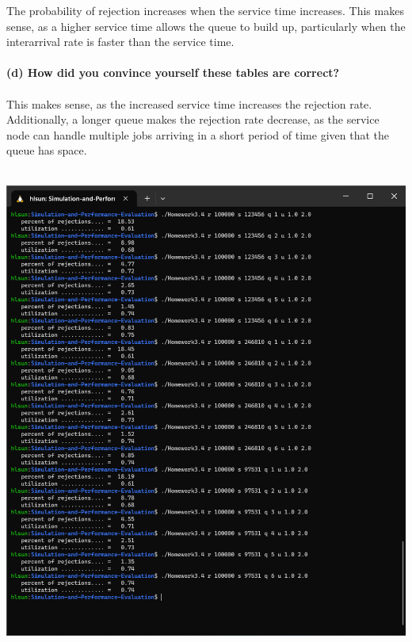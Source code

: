 \noindent The probability of rejection increases when the service time increases. This makes sense, as a higher service time allows the queue to build up, particularly when the interarrival rate is faster than the service time.\\\\

\noindent \textbf{(d) How did you convince yourself these tables are correct?}\\\\
This makes sense, as the increased service time increases the rejection rate. Additionally, a longer queue makes the rejection rate decrease, as the service node can handle multiple jobs arriving in a short period of time given that the queue has space. \\\\
\begin{center}
\includegraphics[scale=0.75]{Sections/Q4/H3_4_A.png}\\

\end{center}
